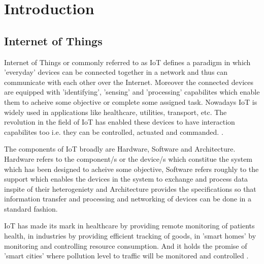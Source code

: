 \documentclass[12pt]{article}
\theoremstyle{definition}
\begin{document}
\section{Introduction}
  \subsection{Internet of Things}
  Internet of Things or commonly referred to as IoT defines a paradigm in which 'everyday' devices can be connected 
  together in a network and thus can communicate with each other over the Internet. Moreover the connected devices are equipped 
  with 'identifying', 'sensing' and 'processing' \cite{Whitmore-survey}
  capabilites which enable them to 
  acheive some objective or complete some assigned task. Nowadays IoT is widely used in applications like
  healthcare, utilities, transport, etc. The revolution in the field of IoT has enabled
  these devices to have interaction capabilites too i.e. they can be controlled, actuated and commanded.
  \cite{Gubbi-vision}. 
  \par The components of IoT broadly are Hardware, Software and Architecture. Hardware refers to the component/s
  or the device/s which constitue the system which has been designed to acheive some objective, Software refers roughly
  to the support which enables the devices in the system to exchange and process data inspite of their heterogeniety 
   and Architecture provides the specifications so that information transfer and processing
   and networking of devices can be done in a standard fashion.
   \par IoT has made its mark in healthcare by providing remote monitoring of patients health, in industries 
   by providing efficient tracking of goods, in 'smart homes' by monitoring and controlling resource consumption.
   And it holds the promise of 'smart cities' where pollution level to traffic will be monitored and controlled
   \cite{Whitmore-survey} \cite{Gubbi-vision}.
\end{document}

